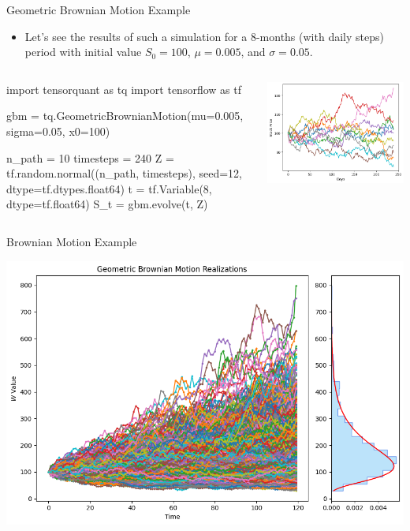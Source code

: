 \documentclass{beamer}
\begin{document}
\begin{frame}[fragile]{Geometric Brownian Motion Example}
\begin{itemize}
    \item Let's see the results of such a simulation for a 8-months (with daily steps) period with initial value $S_0=100$, $\mu=0.005$, and $\sigma=0.05$.
\end{itemize}

\begin{columns}
\begin{ipython}
import tensorquant as tq
import tensorflow as tf

gbm = tq.GeometricBrownianMotion(mu=0.005, sigma=0.05, x0=100)

n_path = 10
timesteps = 240
Z = tf.random.normal((n_path, timesteps), seed=12, 
                     dtype=tf.dtypes.float64)
t = tf.Variable(8, dtype=tf.float64)
S_t = gbm.evolve(t, Z)    
\end{ipython}
\begin{center}    
    \includegraphics[width=1.1\linewidth]{images/gbm_realizations}
\end{center}
\end{columns}
\end{frame}

\begin{frame}[fragile]{Brownian Motion Example}
	\begin{center}    
		\includegraphics[width=0.7\linewidth]{images/gbm_realizations_density}
	\end{center}
\end{frame}
\end{document}
